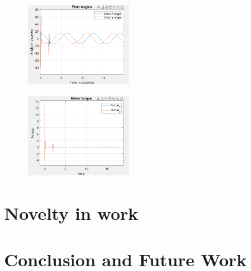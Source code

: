 \documentclass[conference]{IEEEtran}
\begin{document}
\begin{figure}[htbp]
\centerline{\includegraphics[width=0.4\textwidth]{DRCPALQR.png}}
\caption{}
\label{fig}
\end{figure}
\begin{figure}[htbp]
\centerline{\includegraphics[width=0.4\textwidth]{DRCMTLQR.png}}
\caption{}
\label{fig}
\end{figure}


\section{Novelty in work}

\section{Conclusion and Future Work}
\end{document}
